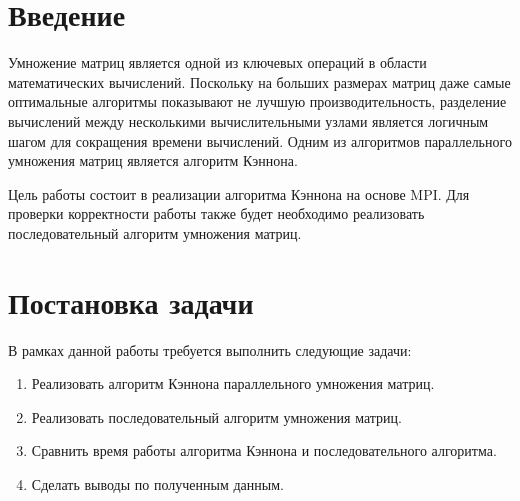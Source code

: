 \documentclass{report}
\begin{document}
\setcounter{page}{2}

\tableofcontents
\newpage

\section*{Введение}
\par Умножение матриц является одной из ключевых операций в области математических вычислений. Поскольку на больших размерах матриц даже самые оптимальные алгоритмы показывают не лучшую производительность, разделение вычислений между несколькими вычислительными узлами является логичным шагом для сокращения времени вычислений. Одним из алгоритмов параллельного умножения матриц является алгоритм Кэннона.
\par Цель работы состоит в реализации алгоритма Кэннона на основе MPI. Для проверки корректности работы также будет необходимо реализовать последовательный алгоритм умножения матриц.
\newpage

\section*{Постановка задачи}
\par В рамках данной работы требуется выполнить следующие задачи:
\begin{enumerate}
    \item Реализовать алгоритм Кэннона параллельного умножения матриц.
    \item Реализовать последовательный алгоритм умножения матриц.
    \item Сравнить время работы алгоритма Кэннона и последовательного алгоритма.
    \item Сделать выводы по полученным данным.
\end{enumerate}
\newpage
\end{document}
